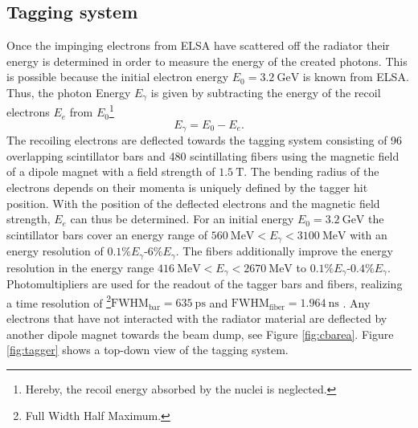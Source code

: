\subsection{Tagging system}
\label{subsec:tag}
Once the impinging electrons from ELSA have scattered off the radiator their energy is determined in order to measure the energy of the created photons. This is possible because the initial electron energy $E_0=\SI{3.2}{\giga\eV}$ is known from ELSA. Thus, the photon Energy $E_\gamma$ is given by subtracting the energy of the recoil electrons $E_e$ from $E_0$\footnote{Hereby, the recoil energy absorbed by the nuclei is neglected.} 
\begin{equation}
	E_\gamma=E_0-E_e.
\end{equation}
The recoiling electrons are deflected towards the tagging system \cite{tagger} consisting of 96 overlapping scintillator bars and 480 scintillating fibers using the magnetic field of a dipole magnet with a field strength of $\SI{1.5}{\tesla}$. The bending radius of the electrons depends on their momenta is uniquely defined by the tagger hit position. With the position of the deflected electrons and the magnetic field strength, $E_e$ can thus be determined. For an initial energy $E_0=\SI{3.2}{\giga\eV}$ the scintillator bars cover an energy range of $\SI{560}{\mega\eV}<E_\gamma<\SI{3100}{\mega\eV}$ with an energy resolution of $0.1\%E_\gamma$-$6\%E_\gamma$. The fibers additionally improve the energy resolution in the energy range $\SI{416}{\mega\eV}<E_\gamma<\SI{2670}{\mega\eV}$ to $0.1\%E_\gamma$-$0.4\%E_\gamma$. Photomultipliers are used for the readout of the tagger bars and fibers, realizing a time resolution of \footnote{Full Width Half Maximum.}$\text{FWHM}_\text{bar}=\SI{635}{\pico\s}$ and $\text{FWHM}_\text{fiber}=\SI{1.964}{\nano\s}$ \cite{hartmanndipl}. Any electrons that have not interacted with the radiator material are deflected by another dipole magnet towards the beam dump, see Figure \ref{fig:cbarea}. Figure \ref{fig:tagger} shows a top-down view of the tagging system.

